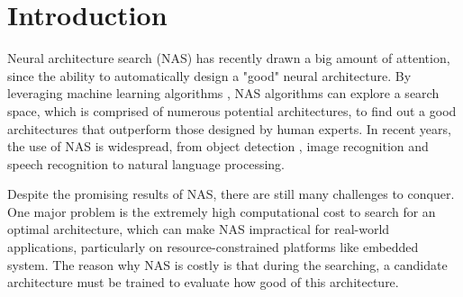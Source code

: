 \documentclass[sigconf]{acmart}
\begin{document}
\section{Introduction}
\label{sec:introduction}

    Neural architecture search (NAS) has recently drawn a big amount of 
    attention, since the ability to automatically design a "good" neural 
    architecture. By leveraging machine learning algorithms \cite{https://doi.org/10.48550/arxiv.1611.01578}, 
    NAS algorithms can explore a search space, which is comprised of numerous 
    potential architectures, to find out a good architectures that outperform 
    those designed by human experts. In recent years, the use of NAS is 
    widespread, from object detection \cite{https://doi.org/10.48550/arxiv.2111.13336}, 
    image recognition \cite{https://doi.org/10.48550/arxiv.2006.04647} 
    and speech recognition \cite{https://doi.org/10.48550/arxiv.2011.05649} 
    \cite{mehrotra2021nasbenchasr} to natural language 
    processing. \cite{jiang-etal-2019-improved} 
    \cite{https://doi.org/10.48550/arxiv.2006.07116} 
    \cite{https://doi.org/10.48550/arxiv.2005.14187}

    Despite the promising results of NAS, there are still many challenges 
    to conquer. One major problem is the extremely high computational 
    cost to search for an optimal architecture, which can make NAS impractical 
    for real-world applications, particularly on resource-constrained 
    platforms like embedded system. The reason why NAS is costly is that 
    during the searching, a candidate architecture must be trained to 
    evaluate how good of this architecture.
\end{document}

